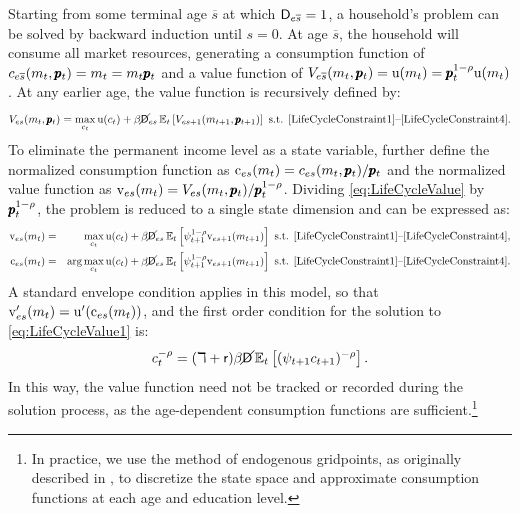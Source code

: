 \documentclass[12pt,titlepage]{econtex}
\begin{document}
Starting from some terminal age $\overline{s}$ at which $\mathsf{D}_{e\overline{s}} = 1$, a household's problem can be solved by backward induction until $s = 0$.  At age $\overline{s}$, the household will consume all market resources, generating a consumption function of $c_{e\overline{s}}(m_t,\pmb{p}_t) = m_t = m_t \pmb{p}_t$ and a value function of $V_{e\overline{s}}(m_t,\pmb{p}_t) = {\mathrm{u}}(m_t) = \pmb{p}_t^{1-\rho} {\mathrm{u}}(m_t)$.  At any earlier age, the value function is recursively defined by:
\begin{equation}
  \label{eq:LifeCycleValue}
  V_{es}(m_t,\pmb{p}_t) = \max_{c_t} {\mathrm{u}}(c_t) + \beta \cancel{\mathsf{D}}_{es} \operatorname{\mathbb{E}}_t \left[ V_{es+1}(m_{t+1},\pmb{p}_{t+1})\right] \text{ s.t. \eqref{LifeCycleConstraint1}--\eqref{LifeCycleConstraint4}}.
\end{equation}
To eliminate the permanent income level as a state variable, further define the normalized consumption function as $\mathrm{c}_{es}(m_t) = c_{es}(m_t,\pmb{p}_t)/\pmb{p}_t$ and the normalized value function as $\mathrm{v}_{es}(m_t) = V_{es}(m_t,\pmb{p}_t)/\pmb{p}_t^{1-\rho}$.  Dividing \eqref{eq:LifeCycleValue} by $\pmb{p}_t^{1-\rho}$, the problem is reduced to a single state dimension and can be expressed as:
\begin{eqnarray}\label{eq:LifeCycleValue1}
  \mathrm{v}_{es}(m_t) &=& \max_{c_t} {\mathrm{u}}(c_t) + \beta \cancel{\mathsf{D}}_{es} \operatorname{\mathbb{E}}_t \left[\psi_{t+1}^{1-\rho} \mathrm{v}_{es+1}(m_{t+1})\right] \text{ s.t. \eqref{LifeCycleConstraint1}--\eqref{LifeCycleConstraint4}},\\
  \mathrm{c}_{es}(m_t) &=& \arg\max_{c_t} {\mathrm{u}}(c_t) + \beta \cancel{\mathsf{D}}_{es} \operatorname{\mathbb{E}}_t \left[\psi_{t+1}^{1-\rho} \mathrm{v}_{es+1}(m_{t+1})\right] \text{ s.t. \eqref{LifeCycleConstraint1}--\eqref{LifeCycleConstraint4}}. \nonumber
\end{eqnarray}
A standard envelope condition applies in this model, so that $\mathrm{v}_{es}^{\prime}(m_t) = {\mathrm{u}}^{\prime}(\mathrm{c}_{es}(m_t))$, and the first order condition for the solution to \eqref{eq:LifeCycleValue1} is:
\begin{equation}
  c_t^{-\rho} = (\daleth +\mathsf{r}) \beta \cancel{\mathsf{D}} \operatorname{\mathbb{E}}_t \left[ (\psi_{t+1} c_{t+1})^{-\rho} \right].
\end{equation}
In this way, the value function need not be tracked or recorded during the solution process, as the age-dependent consumption functions are sufficient.\footnote{In practice, we use the method of endogenous gridpoints, as originally described in \cite{carrollEGM}, to discretize the state space and approximate consumption functions at each age and education level.}
\end{document}
